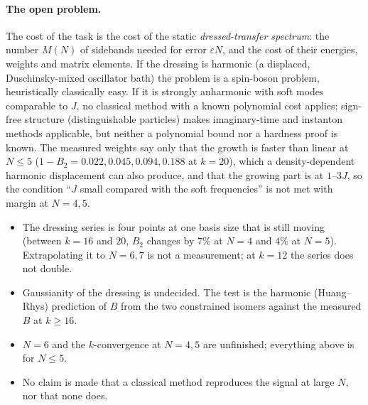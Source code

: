 \paragraph{The open problem.}
The cost of the task is the cost of the static \emph{dressed-transfer spectrum}: the number $M(N)$ of sidebands needed for error $\varepsilon N$, and the cost of their energies, weights and matrix elements. If the dressing is harmonic (a displaced, Duschinsky-mixed oscillator bath) the problem is a spin-boson problem, heuristically classically easy. If it is strongly anharmonic with soft modes comparable to $J$, no classical method with a known polynomial cost applies; sign-free structure (distinguishable particles) makes imaginary-time and instanton methods applicable, but neither a polynomial bound nor a hardness proof is known. The measured weights say only that the growth is faster than linear at $N\le5$ ($1-B_2=0.022,0.045,0.094,0.188$ at $k=20$), which a density-dependent harmonic displacement can also produce, and that the growing part is at $1$--$3J$, so the condition ``$J$ small compared with the soft frequencies'' is not met with margin at $N=4,5$.

\begin{honesty}
\begin{itemize}[itemsep=0.15em]
\item The dressing series is four points at one basis size that is still moving (between $k=16$ and $20$, $B_2$ changes by $7\%$ at $N=4$ and $4\%$ at $N=5$). Extrapolating it to $N=6,7$ is not a measurement; at $k=12$ the series does not double.
\item Gaussianity of the dressing is undecided. The test is the harmonic (Huang--Rhys) prediction of $B$ from the two constrained isomers against the measured $B$ at $k\ge16$.
\item $N=6$ and the $k$-convergence at $N=4,5$ are unfinished; everything above is for $N\le5$.
\item No claim is made that a classical method reproduces the signal at large $N$, nor that none does.
\end{itemize}
\end{honesty}
